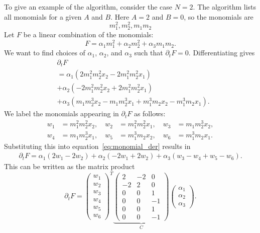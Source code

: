 \documentclass[english,master]{liumaiex}
\theoremstyle{thesisplain}
\theoremstyle{thesisdefinition}
\numberwithin{equation}{section}
\begin{document}
To give an example of the algorithm, consider the case $N = 2$. The algorithm lists all monomials for a given $A$ and $B$. Here $A = 2$ and $B = 0$, so the monomials are
\begin{equation}
	m_1^2, m_2^2, m_1 m_2
\end{equation}
Let $F$ be a linear combination of the monomials:
\begin{equation}
	F = \alpha_1 m_1^2 + \alpha_2 m_2^2 + \alpha_3 m_1 m_2.
\end{equation}
We want to find choices of $\alpha_1$, $\alpha_2$, and $\alpha_3$ such that $\partial_t F = 0$. Differentiating gives
\begin{equation} \label{eq:monomial_der}
\begin{aligned}
	&\partial_t F \\
	&= \alpha_1 (2m_1^2 m_2^2 x_2 - 2m_1^2 m_2^2 x_1) \\
	&+ \alpha_2 (-2m_1^2 m_2^2 x_2 + 2m_1^2 m_2^2 x_1) \\
	&+ \alpha_3 (m_1 m_2^3 x_2 - m_1 m_2^3 x_1 + m_1^3 m_2 x_2 - m_1^3 m_2 x_1).
\end{aligned}
\end{equation}
We label the monomials appearing in $\partial_t F$ as follows:
\begin{equation}
\begin{aligned}
	w_1 &= m_1^2 m_2^2 x_2, \quad
	w_2 &= m_1^2 m_2^2 x_1, \quad
	w_3 &= m_1 m_2^3 x_2, \\
	w_4 &= m_1 m_2^3 x_1, \quad
	w_5 &= m_1^3 m_2 x_2, \quad
	w_6 &= m_1^3 m_2 x_1.
\end{aligned}
\end{equation}
Substituting this into equation~\eqref{eq:monomial_der} results in
\begin{equation}
\begin{aligned}
	\partial_t F =
	\alpha_1 (2w_1 - 2w_2)
	+ \alpha_2 (-2w_1 + 2w_2)
	+ \alpha_3 (w_3 - w_4 + w_5 - w_6).
\end{aligned}
\end{equation}
This can be written as the matrix product
\begin{equation}
	\partial_t F =
\begin{pmatrix}
	w_1 \\ w_2 \\ w_3 \\ w_4 \\ w_5 \\ w_6
\end{pmatrix}^T
\underbrace{
\begin{pmatrix}
	2 & -2 & 0 \\
	-2 & 2 & 0 \\
	0 & 0 & 1 \\
	0 & 0 & -1 \\
	0 & 0 & 1 \\
	0 & 0 & -1
\end{pmatrix}
}_{C}
\begin{pmatrix}
	\alpha_1 \\ \alpha_2 \\ \alpha_3
\end{pmatrix}.
\end{equation}
\end{document}
